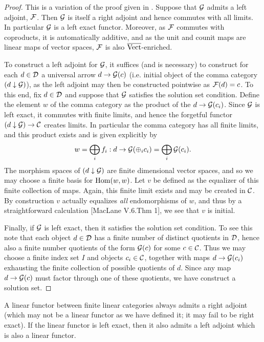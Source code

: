 \documentclass{amsart}
\begin{document}
\begin{proof} This is a variation of the proof given in \cite[V.6.Thm 2]{MR0354798}.
Suppose that $\mathcal G$ admits a left adjoint, $\mathcal F$. Then $\mathcal G$ is itself a right adjoint and hence commutes with all limits. In particular $\mathcal G$ is a left exact functor. Moreover, as $\mathcal F$ commutes with coproducts, it is automatically additive, and as the unit and counit maps are linear maps of vector spaces, $\mathcal F$ is also $\overline{\mathrm{Vect}}$-enriched. 


To construct a left adjoint for $\mathcal G$, it suffices (and is necessary) to construct for each $d \in \mathcal D$ a universal arrow $d \to \mathcal G(c)$ (i.e. initial object of the comma category $(d \downarrow \mathcal G)$),
as the left adjoint may then be constructed pointwise as $\mathcal F(d) = c$. To this end, fix $d \in \mathcal D$ and suppose that $\mathcal G$ satisfies the solution set condition. Define the element $w$ of the comma category as the product of the $d \to \mathcal G(c_i)$. Since $\mathcal G$ is left exact, it commutes with finite limits, and hence the forgetful functor $(d \downarrow \mathcal G) \to \mathcal C$ creates limits. In particular the comma category has all finite limits, and this  product exists and is given explicitly by 
\begin{equation*}
	w = \bigoplus_i f_i :  d \to \mathcal G( \oplus_i c_i) = \bigoplus_i \mathcal G(c_i).
\end{equation*}
The morphism spaces of $(d \downarrow \mathcal G)$ are finite dimensional vector spaces, and so we may choose a finite basis for $\operatorname{Hom}(w,w)$. Let $v$ be defined as the equalizer of this finite collection of maps. Again, this finite limit exists and may be created in $\mathcal C$. By construction $v$ actually equalizes {\em all} endomorphisms of $w$, and thus by a straightforward calculation [MacLane V.6.Thm 1], we see that $v$ is initial. 

Finally, if $\mathcal G$ is left exact, then it satisfies the solution set condition. To see this note that each object $d \in \mathcal D$  has a finite number of distinct quotients in $\mathcal D$, hence also a finite number quotients of the form  $\mathcal G(c)$ for some $c \in \mathcal C$. Thus we may choose a finite index set $I$ and objects  $c_i \in \mathcal C$, together with maps $d \to \mathcal G(c_i)$ exhausting the finite collection of possible quotients of $d$. Since any map $d \to \mathcal G(c)$ must factor through one of these quotients, we have construct a solution set.   
\end{proof}

\begin{corollary}
	A linear functor between finite linear categories always admits a right adjoint (which may not be a linear functor as we have defined it; it may fail to be right exact). If the linear functor is left exact, then it also admits a left adjoint which is also a linear functor. 
\end{corollary}
\end{document}
